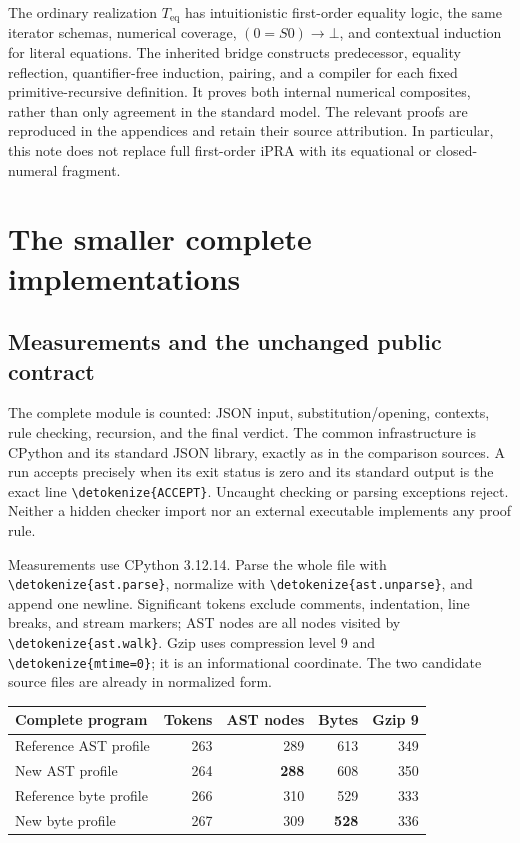 \documentclass[11pt,letterpaper]{article}
\theoremstyle{definition}
\theoremstyle{remark}
\newcommand{\file}[1]{\expandafter\nolinkurl\expandafter{\detokenize{#1}}}
\begin{document}
The ordinary realization $T_{\mathrm{eq}}$ has intuitionistic first-order
equality logic, the same iterator schemas, numerical coverage,
$(0=S0)\to\bot$, and contextual induction for literal equations. The
inherited bridge constructs predecessor, equality reflection,
quantifier-free induction, pairing, and a compiler for each fixed
primitive-recursive definition. It proves both internal numerical
composites, rather than only agreement in the standard model. The relevant
proofs are reproduced in the appendices and retain their source
attribution. In particular, this note does not replace full first-order
iPRA with its equational or closed-numeral fragment.

\section{The smaller complete implementations}

\subsection{Measurements and the unchanged public contract}

The complete module is counted: JSON input, substitution/opening,
contexts, rule checking, recursion, and the final verdict. The common
infrastructure is CPython and its standard JSON library, exactly as in the
comparison sources. A run accepts precisely when its exit status is zero
and its standard output is the exact line \file{ACCEPT}. Uncaught checking
or parsing exceptions reject. Neither a hidden checker import nor an
external executable implements any proof rule.

Measurements use CPython 3.12.14. Parse the whole file with \file{ast.parse},
normalize with \file{ast.unparse}, and append one newline. Significant
tokens exclude comments, indentation, line breaks, and stream markers;
AST nodes are all nodes visited by \file{ast.walk}. Gzip uses compression
level 9 and \file{mtime=0}; it is an informational coordinate. The two
candidate source files are already in normalized form.

\begin{center}
\begin{tabular}{lrrrr}
\toprule
Complete program & Tokens & AST nodes & Bytes & Gzip 9\\
\midrule
Reference AST profile &263&289&613&349\\
New AST profile       &264&\textbf{288}&608&350\\
Reference byte profile&266&310&529&333\\
New byte profile      &267&309&\textbf{528}&336\\
\bottomrule
\end{tabular}
\end{center}
\end{document}
